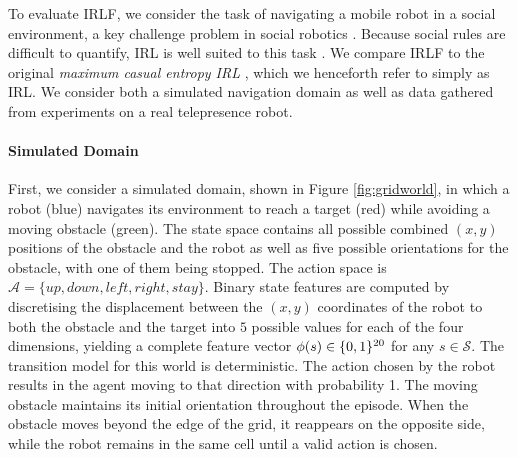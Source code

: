 \documentclass[letterpaper]{article}
\begin{document}
To evaluate IRLF, we consider the task of navigating a mobile robot in a social environment, a key challenge problem in social robotics \cite{pacchierotti2006embodied}. Because social rules are difficult to quantify, IRL is well suited to this task \cite{henry2010learning,vasquez2014inverse}.  We compare IRLF to the original \emph{maximum casual entropy IRL} \cite{ziebart2008maximum}, which we henceforth refer to simply as IRL.  We  consider both a simulated navigation domain as well as data gathered from experiments on a real telepresence robot.
\vspace{-3mm}
\paragraph{Simulated Domain}

First, we consider a simulated domain, shown in Figure \ref{fig:gridworld}, in which a robot (blue) navigates its environment to reach a target (red) while avoiding a moving
obstacle (green). The state space contains all possible combined $(x,y)$ positions of the obstacle and the robot as well as five possible orientations for the obstacle, with one of them being stopped. The action space is $\mathcal{A} = \{up,down,left,right,stay\}$. Binary state features are computed by discretising the displacement between the $(x,y)$ coordinates of the robot to both the obstacle and the target into $5$ possible values for each of the four dimensions, yielding a complete feature vector $\phi(s)\in\mathbb \{0,1\}^{20}$ for any $s\in\mathcal{S}$. The transition model for this world is deterministic. The action chosen by the robot results in the agent moving to that direction with probability 1. The moving obstacle maintains its initial orientation throughout the episode. When the obstacle moves beyond the edge of the grid, it reappears on the opposite side, while the robot remains in the same cell until a valid action is chosen.
\end{document}
